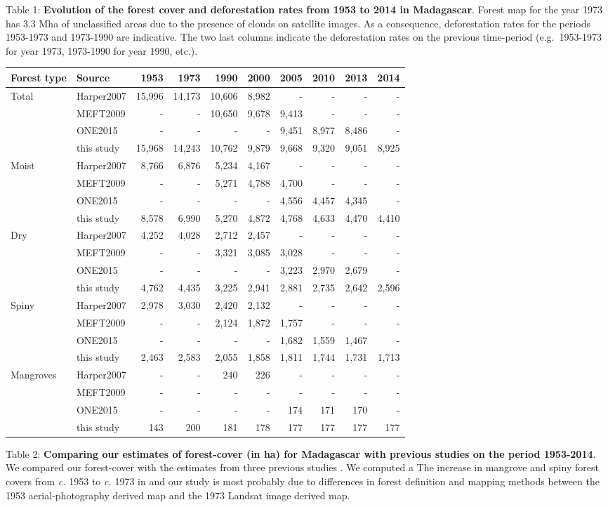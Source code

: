 \documentclass[]{article}
\begin{document}
Table 1: \textbf{Evolution of the forest cover and deforestation rates
from 1953 to 2014 in Madagascar}. Forest map for the year 1973 has 3.3
Mha of unclassified areas due to the presence of clouds on satellite
images. As a consequence, deforestation rates for the periods 1953-1973
and 1973-1990 are indicative. The two last columns indicate the
deforestation rates on the previous time-period (e.g.~1953-1973 for year
1973, 1973-1990 for year 1990, etc.).

\begin{longtable}[]{@{}llrrrrrrrr@{}}
\toprule
Forest type & Source & 1953 & 1973 & 1990 & 2000 & 2005 & 2010 & 2013 &
2014\tabularnewline
\midrule
\endhead
Total & Harper2007 & 15,996 & 14,173 & 10,606 & 8,982 & - & - & - &
-\tabularnewline
& MEFT2009 & - & - & 10,650 & 9,678 & 9,413 & - & - & -\tabularnewline
& ONE2015 & - & - & - & - & 9,451 & 8,977 & 8,486 & -\tabularnewline
& this study & 15,968 & 14,243 & 10,762 & 9,879 & 9,668 & 9,320 & 9,051
& 8,925\tabularnewline
Moist & Harper2007 & 8,766 & 6,876 & 5,234 & 4,167 & - & - & - &
-\tabularnewline
& MEFT2009 & - & - & 5,271 & 4,788 & 4,700 & - & - & -\tabularnewline
& ONE2015 & - & - & - & - & 4,556 & 4,457 & 4,345 & -\tabularnewline
& this study & 8,578 & 6,990 & 5,270 & 4,872 & 4,768 & 4,633 & 4,470 &
4,410\tabularnewline
Dry & Harper2007 & 4,252 & 4,028 & 2,712 & 2,457 & - & - & - &
-\tabularnewline
& MEFT2009 & - & - & 3,321 & 3,085 & 3,028 & - & - & -\tabularnewline
& ONE2015 & - & - & - & - & 3,223 & 2,970 & 2,679 & -\tabularnewline
& this study & 4,762 & 4,435 & 3,225 & 2,941 & 2,881 & 2,735 & 2,642 &
2,596\tabularnewline
Spiny & Harper2007 & 2,978 & 3,030 & 2,420 & 2,132 & - & - & - &
-\tabularnewline
& MEFT2009 & - & - & 2,124 & 1,872 & 1,757 & - & - & -\tabularnewline
& ONE2015 & - & - & - & - & 1,682 & 1,559 & 1,467 & -\tabularnewline
& this study & 2,463 & 2,583 & 2,055 & 1,858 & 1,811 & 1,744 & 1,731 &
1,713\tabularnewline
Mangroves & Harper2007 & - & - & 240 & 226 & - & - & - &
-\tabularnewline
& MEFT2009 & - & - & - & - & - & - & - & -\tabularnewline
& ONE2015 & - & - & - & - & 174 & 171 & 170 & -\tabularnewline
& this study & 143 & 200 & 181 & 178 & 177 & 177 & 177 &
177\tabularnewline
\bottomrule
\end{longtable}

Table 2: \textbf{Comparing our estimates of forest-cover (in ha) for
Madagascar with previous studies on the period 1953-2014}. We compared
our forest-cover with the estimates from three previous studies
\citep{Harper2007, MEFT2009, ONE2015}. We computed a The increase in
mangrove and spiny forest covers from \emph{c.} 1953 to \emph{c.} 1973
in \citet{Harper2007} and our study is most probably due to differences
in forest definition and mapping methods between the 1953
aerial-photography derived map and the 1973 Landsat image derived map.
\end{document}
